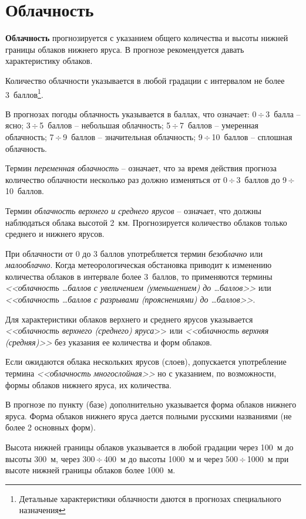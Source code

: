 \documentclass[a4paper, 12pt, twoside, final, book, russian, fittopage, cyremdash, openright]{ncc}
\newcommand{\otdo}{\,\ensuremath{\div}\,}
\begin{document}
\section{Облачность}
\label{sec:clouds_p}

\textbf{Облачность} прогнозируется с указанием общего количества и
высоты нижней границы облаков нижнего яруса. В прогнозе рекомендуется
давать характеристику облаков.

Количество облачности указывается в любой градации с интервалом не
более 3~баллов\footnote{Детальные характеристики облачности даются в
  прогнозах специального назначения}.

В прогнозах погоды облачность указывается в баллах, что означает:
0\otdo3~балла \--- ясно; 3\otdo5~баллов \--- небольшая облачность;
5\otdo7~баллов \--- умеренная облачность; 7\otdo9~баллов \---
значительная облачность; 9\otdo10~баллов \--- сплошная облачность.

Термин \textit{переменная облачность} \--- означает, что за время
действия прогноза количество облачности несколько раз должно
изменяться от 0\otdo3~баллов до 9\otdo10~баллов.

Термин \textit{облачность верхнего и среднего ярусов} \--- означает,
что должны наблюдаться облака высотой 2~км. Прогнозируется количество
облаков только среднего и нижнего ярусов.

При облачности от 0 до 3 баллов употребляется термин
\textit{безоблачно} или \textit{малооблачно}. Когда метеорологическая
обстановка приводит к изменению количества облаков в интервале более
3~баллов, то применяются термины \textit{<<облачность \ldots баллов с увеличением
(уменьшением) до \ldots баллов>>} или \textit{<<облачность \ldots баллов с разрывами
(прояснениями) до \ldots баллов>>}.

Для характеристики облаков верхнего и среднего ярусов указывается
\textit{<<облачность верхнего (среднего) яруса}>> или
\textit{<<облачность верхняя (средняя)>>} без указания ее количества и
форм облаков.

Если ожидаются облака нескольких ярусов (слоев), допускается
употребление термина \textit{<<облачность многослойная>>} но с
указанием, по возможности, формы облаков нижнего яруса, их количества.

В прогнозе по пункту (базе) дополнительно указывается форма облаков
нижнего яруса. Форма облаков нижнего яруса дается полными русскими
названиями (не более 2 основных форм).

Высота нижней границы облаков указывается в любой градации через 100~м
до высоты 300~м, через 300\otdo400~м до высоты 1000~м и через 500\otdo1000~м
при высоте нижней границы облаков более 1000~м.
\end{document}
